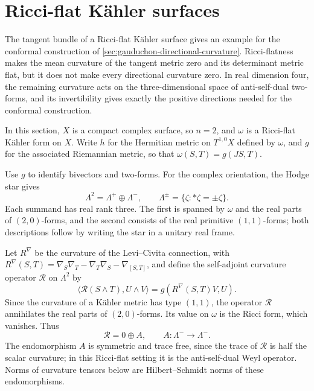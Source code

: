 \section{Ricci-flat K\"ahler surfaces}
\label{sec:ricci-flat-surface-rc}

The tangent bundle of a Ricci-flat K\"ahler surface gives an example for the conformal construction of \cref{sec:gauduchon-directional-curvature}. Ricci-flatness makes the mean curvature of the tangent metric zero and its determinant metric flat, but it does not make every directional curvature zero. In real dimension four, the remaining curvature acts on the three-dimensional space of anti-self-dual two-forms, and its invertibility gives exactly the positive directions needed for the conformal construction.

In this section, $X$ is a compact complex surface, so $n=2$, and $\omega$ is a Ricci-flat K\"ahler form on $X$. Write $h$ for the Hermitian metric on $T^{1,0}X$ defined by $\omega$, and $g$ for the associated Riemannian metric, so that $\omega(S,T)=g(JS,T)$.

Use $g$ to identify bivectors and two-forms. For the complex orientation, the Hodge star gives
\[
 \Lambda^2=\Lambda^+\oplus\Lambda^-,\qquad
 \Lambda^\pm=\{\zeta:*\zeta=\pm\zeta\}.
\]
Each summand has real rank three. The first is spanned by $\omega$ and the real parts of $(2,0)$-forms, and the second consists of the real primitive $(1,1)$-forms; both descriptions follow by writing the star in a unitary real frame.

Let $R^\nabla$ be the curvature of the Levi--Civita connection, with
$R^\nabla(S,T)=\nabla_S\nabla_T-\nabla_T\nabla_S-\nabla_{[S,T]}$, and define the self-adjoint curvature operator $\mathscr R$ on $\Lambda^2$ by
\[
 \langle\mathscr R(S\wedge T),U\wedge V\rangle
       =g(R^\nabla(S,T)V,U).
\]
Since the curvature of a K\"ahler metric has type $(1,1)$, the operator $\mathscr R$ annihilates the real parts of $(2,0)$-forms. Its value on $\omega$ is the Ricci form, which vanishes. Thus
\[
 \mathscr R=0\oplus A,\qquad A\colon\Lambda^-\longrightarrow\Lambda^-.
\]
The endomorphism $A$ is symmetric and trace free, since the trace of $\mathscr R$ is half the scalar curvature; in this Ricci-flat setting it is the anti-self-dual Weyl operator. Norms of curvature tensors below are Hilbert--Schmidt norms of these endomorphisms.

